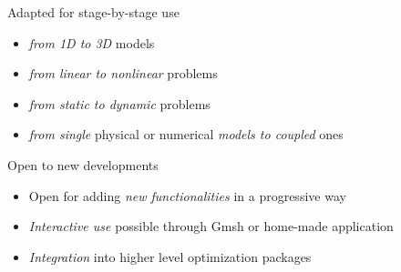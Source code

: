 \begin{slide}

\begin{slideitemize}
\item Adapted for stage-by-stage use
\begin{itemize}
\item \emph{from 1D to 3D} models
\item \emph{from linear to nonlinear} problems
\item \emph{from static to dynamic} problems
\item \emph{from single} physical or numerical \emph{models to coupled} ones
\end{itemize}
\item Open to new developments
\begin{itemize}
\item Open for adding \emph{new functionalities} in a progressive way
\item \emph{Interactive use} possible through Gmsh or home-made application
\item \emph{Integration} into higher level optimization packages
\end{itemize}

\end{slideitemize}

\end{slide}
